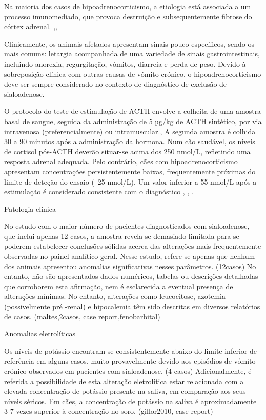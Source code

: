 Na maioria dos casos de hipoadrenocorticismo, a etiologia está associada a um processo imunomediado, que provoca destruição e subsequentemente fibrose do córtex adrenal. \cite{Wakayama2017},\cite{Spence2018},\cite{Mooney2023} 


Clinicamente, os animais afetados apresentam sinais pouco específicos, sendo os mais comuns: letargia acompanhada de uma variedade de sinais gastrointestinais, incluindo anorexia, regurgitação, vómitos, diarreia e perda de peso. \cite{s40} Devido à sobreposição clínica com outras causas de vómito crónico, o hipoadrenocorticismo deve ser sempre considerado no contexto de diagnóstico de exclusão de sialoadenose.


O protocolo do teste de estimulação de ACTH envolve a colheita de uma amostra basal de sangue, seguida da administração de 5 µg/kg de ACTH sintético, por via intravenosa (preferencialmente) ou intramuscular.\cite{Spence2018}, \cite{Mooney2023} A segunda amostra é colhida 30 a 90 minutos após a administração da hormona. \cite{Spence2018}
Num cão saudável, os níveis de cortisol pós-ACTH deverão situar-se acima dos 250 nmol/L, refletindo uma resposta adrenal adequada. \cite{Mooney2023} Pelo contrário, cães com hipoadrenocorticismo apresentam concentrações persistentemente baixas, frequentemente próximas do limite de deteção do ensaio (~25 nmol/L). \cite{Mooney2023} Um valor inferior a 55 nmol/L após a estimulação é considerado consistente com o diagnóstico \cite{Wakayama2017}, \cite{Mooney2023}, \cite{s40}.

Patologia clínica


No estudo com o maior número de pacientes diagnosticados com sialoadenose, que inclui apenas 12 casos, a amostra revela-se demasiado limitada para se poderem estabelecer conclusões sólidas acerca das alterações mais frequentemente observadas no painel analítico geral. Nesse estudo, refere-se apenas que nenhum dos animais apresentou anomalias significativas nesses parâmetros. (12casos) No entanto, não são apresentados dados numéricos, tabelas ou descrições detalhadas que corroborem esta afirmação, nem é esclarecida a eventual presença de alterações mínimas.
No entanto, alterações como leucocitose, azotemia (possivelmente pré -renal) e hipocalemia têm sido descritas em diversos relatórios de casos. (maltes,2casos, case report,fenobarbital)


Anomalias eletrolíticas


Os níveis de potássio encontram-se consistentemente abaixo do limite inferior de referência em alguns casos, muito provavelmente devido aos episódios de vómito crónico observados em pacientes com sialoadenose. (4 casos) Adicionalmente, é referida a possibilidade de esta alteração eletrolítica estar relacionada com a elevada concentração de potássio presente na saliva, em comparação aos seus níveis séricos. Em cães, a concentração de potássio na saliva é aproximadamente 3-7 vezes superior à concentração no soro. (gillor2010, case report)


